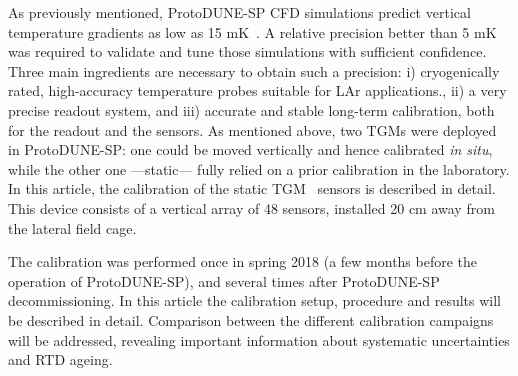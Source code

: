 As previously mentioned, ProtoDUNE-SP CFD simulations predict vertical temperature gradients as low as 15 mK~\cite{pdsp_tdr}. A relative precision better than 5 mK was required to validate and tune those simulations with sufficient confidence. Three main ingredients are necessary to obtain such a precision: i) cryogenically rated, high-accuracy temperature probes suitable for LAr applications., ii) a very precise readout system, and iii) accurate and stable long-term calibration, both for the readout and the sensors. As mentioned above, two TGMs were deployed in ProtoDUNE-SP: one could be moved vertically and hence calibrated \textit{in situ}, while the other one ---static--- fully relied on a prior calibration in the laboratory. In this article, the calibration of the static TGM~\cite{tfm} sensors is described in detail. This device consists of a vertical array of 48 sensors, installed 20 cm away from the lateral field cage.

The calibration was performed once in spring 2018  (a few months before the operation of ProtoDUNE-SP), and several times after ProtoDUNE-SP decommissioning. In this article the calibration setup, procedure and results will be described in detail. Comparison between the different calibration campaigns will be addressed, revealing important information about systematic uncertainties and RTD ageing.